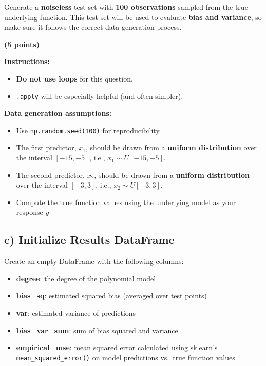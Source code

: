 \documentclass[
  letterpaper,
  DIV=11,
  numbers=noendperiod]{scrreprt}
\providecommand{\tightlist}{%
  \setlength{\itemsep}{0pt}\setlength{\parskip}{0pt}}\usepackage{longtable,booktabs,array}
\begin{document}
Generate a \textbf{noiseless} test set with \textbf{100 observations}
sampled from the true underlying function. This test set will be used to
evaluate \textbf{bias and variance}, so make sure it follows the correct
data generation process.

\textbf{(5 points)}

\textbf{Instructions:}

\begin{itemize}
\tightlist
\item
  \textbf{Do not use loops} for this question.
\item
  \texttt{.apply} will be especially helpful (and often simpler).
\end{itemize}

\textbf{Data generation assumptions:}

\begin{itemize}
\tightlist
\item
  Use \texttt{np.random.seed(100)} for reproducibility.
\item
  The first predictor, \(x_1\), should be drawn from a \textbf{uniform
  distribution} over the interval \([-15, -5]\), i.e.,
  \(x_1 \sim U[-15, -5]\).
\item
  The second predictor, \(x_2\), should be drawn from a \textbf{uniform
  distribution} over the interval \([-3, 3]\), i.e.,
  \(x_2 \sim U[-3, 3]\).
\item
  Compute the true function values using the underlying model as your
  response \(y\)
\end{itemize}

\subsection{c) Initialize Results
DataFrame}\label{c-initialize-results-dataframe}

Create an empty DataFrame with the following columns:

\begin{itemize}
\tightlist
\item
  \textbf{degree}: the degree of the polynomial model\\
\item
  \textbf{bias\_sq}: estimated squared bias (averaged over test
  points)\\
\item
  \textbf{var}: estimated variance of predictions\\
\item
  \textbf{bias\_var\_sum}: sum of bias squared and variance\\
\item
  \textbf{empirical\_mse}: mean squared error calculated using sklearn's
  \texttt{mean\_squared\_error()} on model predictions vs.~true function
  values
\end{itemize}
\end{document}
